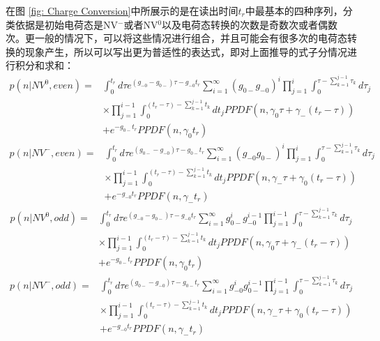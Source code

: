 \documentclass[type = bachelor]{whu-thesis}
\begin{document}
在图 \ref{fig: Charge Conversion}中所展示的是在读出时间$t_r$中最基本的四种序列，分类依据是初始电荷态是NV$^-$或者NV$^0$以及电荷态转换的次数是奇数次或者偶数次。更一般的情况下，可以将这些情况进行组合，并且可能会有很多次的电荷态转换的现象产生，所以可以写出更为普适性的表达式，即对上面推导的式子分情况进行积分和求和：
\begin{equation}
  \begin{aligned}
    p(n|NV^0,even)=&\int_{0}^{t_r}d\tau e^{(g_{-0}-g_{0-})\tau-g_{-0}t_r} \sum_{i=1}^{\infty}(g_{0-}g_{-0})^i \prod_{j=1}^{i}\int_{0}^{\tau-\sum_{k=1}^{j-1}\tau_k}d\tau_j \\
    & \times \prod_{j=1}^{i-1}\int_{0}^{(t_r-\tau)-\sum_{k=1}^{j-1}t_k}dt_jPPDF(n, \gamma_0\tau+\gamma_-(t_r-\tau)) \\
    & + e^{-g_{0-}t_r}PPDF(n, \gamma_0t_r)
  \end{aligned}
\end{equation}
\begin{equation}
  \begin{aligned}
    p(n|NV^-,even)=&\int_{0}^{t_r}d\tau e^{(g_{0-}-g_{-0})\tau-g_{0-}t_r} \sum_{i=1}^{\infty}(g_{-0}g_{0-})^i \prod_{j=1}^{i}\int_{0}^{\tau-\sum_{k=1}^{j-1}\tau_k}d\tau_j \\
    & \times \prod_{j=1}^{i-1}\int_{0}^{(t_r-\tau)-\sum_{k=1}^{j-1}t_k}dt_jPPDF(n, \gamma_-\tau+\gamma_0(t_r-\tau)) \\
    & + e^{-g_{-0}t_r}PPDF(n, \gamma_-t_r)
  \end{aligned}
\end{equation}
\begin{equation}
  \begin{aligned}
    p(n|NV^0,odd)=&\int_{0}^{t_r}d\tau e^{(g_{-0}-g_{0-})\tau-g_{-0}t_r} \sum_{i=1}^{\infty}g_{0-}^ig_{-0}^{i-1} \prod_{j=1}^{i-1}\int_{0}^{\tau-\sum_{k=1}^{j-1}\tau_k}d\tau_j \\
    & \times \prod_{j=1}^{i-1}\int_{0}^{(t_r-\tau)-\sum_{k=1}^{j-1}t_k}dt_jPPDF(n, \gamma_0\tau+\gamma_-(t_r-\tau)) \\
    & + e^{-g_{0-}t_r}PPDF(n, \gamma_0t_r)
  \end{aligned}
\end{equation}
\begin{equation}
  \begin{aligned}
    p(n|NV^-,odd)=&\int_{0}^{t_r}d\tau e^{(g_{0-}-g_{-0})\tau-g_{0-}t_r} \sum_{i=1}^{\infty}g_{-0}^ig_{0-}^{i-1} \prod_{j=1}^{i-1}\int_{0}^{\tau-\sum_{k=1}^{j-1}\tau_k}d\tau_j \\
    & \times \prod_{j=1}^{i-1}\int_{0}^{(t_r-\tau)-\sum_{k=1}^{j-1}t_k}dt_jPPDF(n, \gamma_-\tau+\gamma_0(t_r-\tau)) \\
    & + e^{-g_{-0}t_r}PPDF(n, \gamma_-t_r)
  \end{aligned}
\end{equation}
\end{document}
